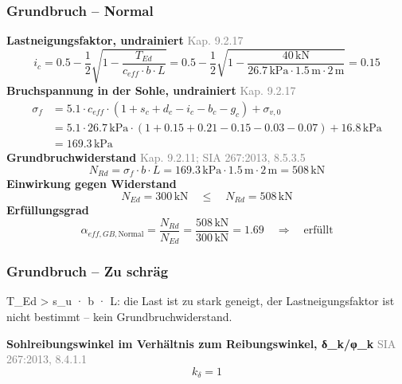\documentclass[11pt,a4paper]{article}
\newcommand{\normref}[1]{{\small\textcolor{gray}{#1}}}
\begin{document}
\subsubsection{Grundbruch – Normal}
\noindent\textbf{Lastneigungsfaktor, undrainiert} \hfill \normref{Kap. 9.2.17}
\begin{equation*}
i_c = 0.5 - \frac{1}{2} \sqrt{1 - \frac{T_{Ed}}{c_{eff} \cdot b \cdot L}} = 0.5 - \frac{1}{2} \sqrt{1 - \frac{40\,\mathrm{kN}}{26.7\,\mathrm{kPa} \cdot 1.5\,\mathrm{m} \cdot 2\,\mathrm{m}}} = 0.15
\end{equation*}
\noindent\textbf{Bruchspannung in der Sohle, undrainiert} \hfill \normref{Kap. 9.2.17}
\begin{equation*}
\begin{aligned}
  \sigma_f &= 5.1 \cdot c_{eff} \cdot \left(1 + s_c + d_c - i_c - b_c - g_c\right) + \sigma_{v,0} \\
  &= 5.1 \cdot 26.7\,\mathrm{kPa} \cdot \left(1 + 0.15 + 0.21 - 0.15 - 0.03 - 0.07\right) + 16.8\,\mathrm{kPa} \\
  &= 169.3\,\mathrm{kPa}
\end{aligned}
\end{equation*}
\noindent\textbf{Grundbruchwiderstand} \hfill \normref{Kap. 9.2.11; SIA 267:2013, 8.5.3.5}
\begin{equation*}
N_{Rd} = \sigma_f \cdot b \cdot L = 169.3\,\mathrm{kPa} \cdot 1.5\,\mathrm{m} \cdot 2\,\mathrm{m} = 508\,\mathrm{kN}
\end{equation*}
\noindent\textbf{Einwirkung gegen Widerstand}
\begin{equation*}
N_{Ed} = 300\,\mathrm{kN} \quad \le \quad N_{Rd} = 508\,\mathrm{kN}
\end{equation*}
\noindent\textbf{Erfüllungsgrad}
\begin{equation*}
\alpha_{eff,GB,\text{Normal}} = \frac{N_{Rd}}{N_{Ed}} = \frac{508\,\mathrm{kN}}{300\,\mathrm{kN}} = 1.69 \quad \Rightarrow \quad \text{erfüllt}
\end{equation*}
\subsubsection{Grundbruch – Zu schräg}
T\_Ed > s\_u · b · L: die Last ist zu stark geneigt, der Lastneigungsfaktor ist nicht bestimmt -- kein Grundbruchwiderstand.

\noindent\textbf{Sohlreibungswinkel im Verhältnis zum Reibungswinkel, δ\_k/φ\_k} \hfill \normref{SIA 267:2013, 8.4.1.1}
\begin{equation*}
k_{\delta} = 1
\end{equation*}
\end{document}
